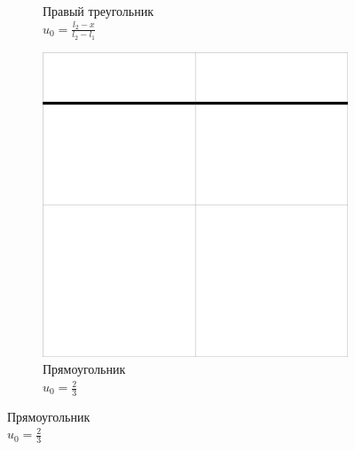 \documentclass[12pt, a4paper]{article}
\begin{document}
\begin{figure}[!hp]
\begin{subfigure}[t]{0.32\textwidth}
		\caption{Правый треугольник \\ $u_0 = \frac{l_2-x}{l_2-l_1}$}
		\label{test2}
	\end{subfigure}
	\hfill
	\begin{subfigure}[t]{0.32\textwidth}
		\centering
		\includegraphics[width=\textwidth]{test3}
		\caption{Прямоугольник \\ $u_0 = \frac{2}{3}$}
		\label{test3}
	\end{subfigure}
	
	\vspace{1em}
	

\end{figure}
\end{document}
